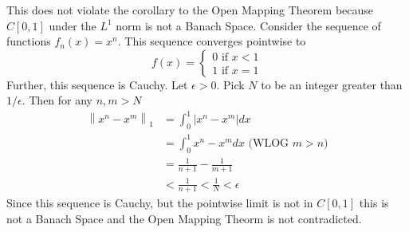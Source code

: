 \documentclass[12pt]{article}
\newcommand{\norm}[1]{\left\lVert#1\right\rVert}
\begin{document}
	This does not violate the corollary to the Open Mapping Theorem because $C[0,1]$ under the $L^1$ norm is not a Banach Space. Consider the sequence of functions $f_n(x) = x^n$. This sequence converges pointwise to 
	$$
	f(x) =
	\begin{cases}
		0 \text{\ \ if $x<1$}\\
		1 \text{\ \ if $x=1$}
	\end{cases}
	$$
	Further, this sequence is Cauchy. Let $\epsilon > 0$. Pick $N$ to be an integer greater than $1/\epsilon$. Then for any $n,m>N$
	\begin{align*}
		\norm{x^n - x^m}_1 & = \int_0^1\vert x^n - x^m \vert dx \\
		& = \int_0^1 x^n - x^m dx \text{\ \ \ (WLOG $m>n$)}\\
		& = \tfrac{1}{n+1} - \tfrac{1}{m+1} \\
		& < \tfrac{1}{n+1} < \tfrac{1}{N} < \epsilon
	\end{align*}
	Since this sequence is Cauchy, but the pointwise limit is not in $C[0,1]$ this is not a Banach Space and the Open Mapping Theorm is not contradicted. 
\end{document}
